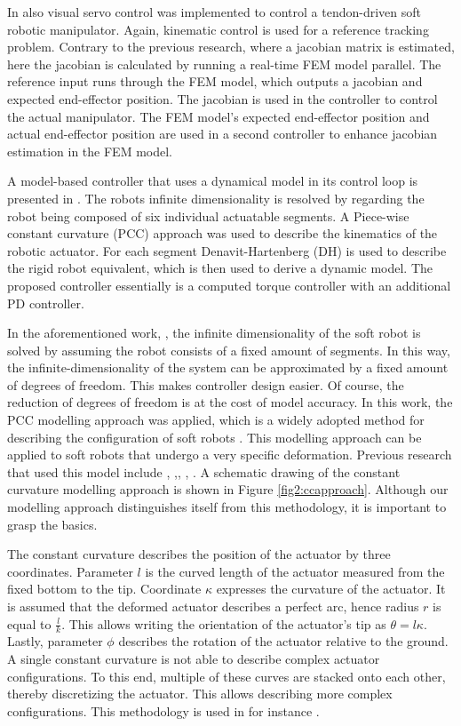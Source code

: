 In \cite{zhang2017visual} also visual servo control was implemented to control a tendon-driven soft robotic manipulator. Again, kinematic control is used for a reference tracking problem. Contrary to the previous research, where a jacobian matrix is estimated, here the jacobian is calculated by running a real-time FEM model parallel. The reference input runs through the FEM model, which outputs a jacobian and expected end-effector position. The jacobian is used in the controller to control the actual manipulator. The FEM model's expected end-effector position and actual end-effector position are used in a second controller to enhance jacobian estimation in the FEM model.

A model-based controller that uses a dynamical model in its control loop is presented in \cite{della2020model}. The robots infinite dimensionality is resolved by regarding the robot being composed of six individual actuatable segments. A Piece-wise constant curvature (PCC) approach was used to describe the kinematics of the robotic actuator. For each segment Denavit-Hartenberg (DH) is used to describe the rigid robot equivalent, which is then used to derive a dynamic model. The proposed controller essentially is a computed torque controller with an additional PD controller. 

In the aforementioned work, \cite{della2020model}, the infinite dimensionality of the soft robot is solved by assuming the robot consists of a fixed amount of segments. In this way, the infinite-dimensionality of the system can be approximated by a fixed amount of degrees of freedom. This makes controller design easier. Of course, the reduction of degrees of freedom is at the cost of model accuracy. In this work, the PCC modelling approach was applied, which is a widely adopted method for describing the configuration of soft robots \cite{ccapproach}. This modelling approach can be applied to soft robots that undergo a very specific deformation. Previous research that used this model include \cite{mahl2014bhakin}, \cite{berkers},\cite{Falkenhahn2015}, \cite{ccapproach}, \cite{runge2017framework}. A schematic drawing of the constant curvature modelling approach is shown in Figure \ref{fig2:ccapproach}. Although our modelling approach distinguishes itself from this methodology, it is important to grasp the basics. 

The constant curvature describes the position of the actuator by three coordinates. Parameter $l$ is the curved length of the actuator measured from the fixed bottom to the tip. Coordinate $\kappa$ expresses the curvature of the actuator. It is assumed that the deformed actuator describes a perfect arc, hence radius $r$ is equal to $\frac{l}{k}$. This allows writing the orientation of the actuator's tip as $\theta = l\kappa$. Lastly, parameter $\phi$ describes the rotation of the actuator relative to the ground. A single constant curvature is not able to describe complex actuator configurations. To this end, multiple of these curves are stacked onto each other, thereby discretizing the actuator. This allows describing more complex configurations. This methodology is used in for instance \cite{Falkenhahn2015}.


